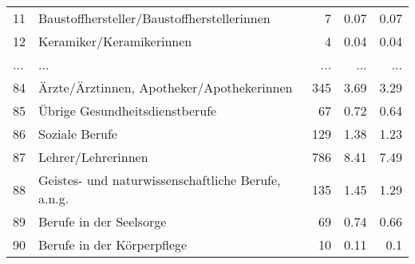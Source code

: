 \begin{longtable}{lXrrr}
        11 & \multicolumn{1}{X}{Baustoffhersteller/Baustoffherstellerinnen} & %
          \num{7} &
          \num[round-mode=places,round-precision=2]{0,07} &
          \num[round-mode=places,round-precision=2]{0,07} \\
        12 & \multicolumn{1}{X}{Keramiker/Keramikerinnen} & %
          \num{4} &
          \num[round-mode=places,round-precision=2]{0,04} &
          \num[round-mode=places,round-precision=2]{0,04} \\
       ... & ... & ... & ... & ... \\
        84 & \multicolumn{1}{X}{Ärzte/Ärztinnen, Apotheker/Apothekerinnen} & %
          \num{345} &
          \num[round-mode=places,round-precision=2]{3,69} &
          \num[round-mode=places,round-precision=2]{3,29} \\

        85 & \multicolumn{1}{X}{Übrige Gesundheitsdienstberufe} & %
          \num{67} &
          \num[round-mode=places,round-precision=2]{0,72} &
          \num[round-mode=places,round-precision=2]{0,64} \\

        86 & \multicolumn{1}{X}{Soziale Berufe} & %
          \num{129} &
          \num[round-mode=places,round-precision=2]{1,38} &
          \num[round-mode=places,round-precision=2]{1,23} \\

        87 & \multicolumn{1}{X}{Lehrer/Lehrerinnen} & %
          \num{786} &
          \num[round-mode=places,round-precision=2]{8,41} &
          \num[round-mode=places,round-precision=2]{7,49} \\

        88 & \multicolumn{1}{X}{Geistes- und naturwissenschaftliche Berufe, a.n.g.} & %
          \num{135} &
          \num[round-mode=places,round-precision=2]{1,45} &
          \num[round-mode=places,round-precision=2]{1,29} \\

        89 & \multicolumn{1}{X}{Berufe in der Seelsorge} & %
          \num{69} &
          \num[round-mode=places,round-precision=2]{0,74} &
          \num[round-mode=places,round-precision=2]{0,66} \\

        90 & \multicolumn{1}{X}{Berufe in der Körperpflege} & %
          \num{10} &
          \num[round-mode=places,round-precision=2]{0,11} &
          \num[round-mode=places,round-precision=2]{0,1} \\


\end{longtable}
